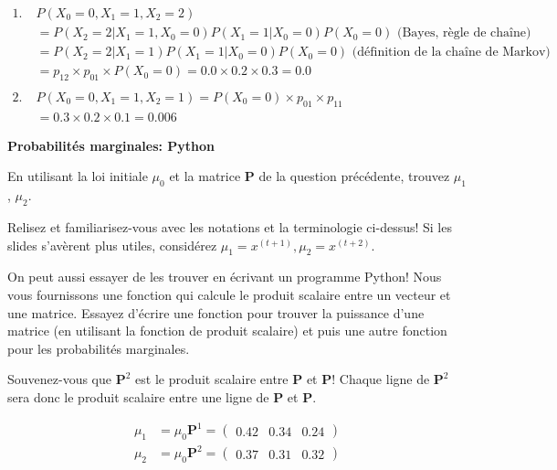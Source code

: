 \begin{Exercice}[15 minutes]
\begin{solution}
\begin{align*}
    1. \; &P(X_0=0,X_1=1, X_2=2) \\ 
    &= P(X_2=2|X_1=1,X_0=0)P(X_1=1|X_0=0)P(X_0 =0) \text{ (Bayes, règle de chaîne)}\\
    &= P(X_2=2|X_1=1)P(X_1=1|X_0=0)P(X_0=0) \text{ (définition de la chaîne de Markov)}\\ 
    &=p_{12} \times p_{01} \times P(X_0=0) = 0.0 \times 0.2 \times 0.3 = 0.0\\
    \\
    2. \; & P(X_0=0,X_1=1, X_2=1)=P(X_0 =0)\times p_{01} \times p_{11}\\
    &= 0.3 \times 0.2\times 0.1 = 0.006
\end{align*}
\end{solution}

\end{Exercice}

\begin{Exercice}[10 minutes]\textbf{Probabilités marginales: Python}

En utilisant la loi initiale $\mu_0$ et la matrice \textbf{P} de la question précédente, trouvez $\mu_1$, $\mu_2$.

\begin{conseil}
    Relisez et familiarisez-vous avec les notations et la terminologie ci-dessus! Si les slides s'avèrent plus utiles, considérez $\mu_1 = x^{(t+1)}, \mu_2 = x^{(t+2)}$.
\end{conseil}

On peut aussi essayer de les trouver en écrivant un programme Python! Nous vous fournissons une fonction qui calcule le produit scalaire entre un vecteur et une matrice. Essayez d'écrire une fonction pour trouver la puissance d'une matrice (en utilisant la fonction de produit scalaire) et puis une autre fonction pour les probabilités marginales.



\begin{conseil}
    Souvenez-vous que $\mathbf{P}^2$ est le produit scalaire entre $\mathbf{P}$ et $\mathbf{P}$! Chaque ligne de  $\mathbf{P}^2$ sera donc le produit scalaire entre une ligne de $\mathbf{P}$ et $\mathbf{P}$.
\end{conseil}
\begin{solution}
\begin{align}
\mu_1 &= \mu_0 \mathbf{P}^1 =
\left(\begin{matrix}
0.42 & 0.34 & 0.24
\end{matrix}\right)\\
\mu_2 &= \mu_0 \mathbf{P}^2 =
\left(\begin{matrix}
0.37 & 0.31 & 0.32
\end{matrix}\right) 
\end{align}



\end{solution}

\end{Exercice}

